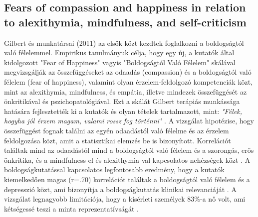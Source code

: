 \subsection*{Fears of compassion and happiness in relation	to alexithymia, mindfulness, and self-criticism \parencite{gilbert_mcewan_gibbons_chotai_duarte_matos_2011}}
Gilbert és munkatársai (2011) az elsők közt kezdtek foglalkozni a boldogságtól való félelemmel. Empirikus tanulmányuk célja, hogy egy új, a kutatók által kidolgozott "Fear of Happiness" vagyis "Boldogságtól Való Félelem" skálával \parencite{gilbert_mcewan_gibbons_chotai_duarte_matos_2011} megvizsgálják az összefüggéseket az odaadás (compassion) és a boldogságtól való félelem (fear of happiness), valamint olyan érzelem-feldolgozó kompetenciák közt, mint az  alexithymia, mindfulness, és empátia, illetve mindezek összefüggését az önkritikával és pszichopatológiával. Ezt a skálát Gilbert terápiás munkássága hatására fejlesztették ki a kutatók és olyan tételek tartalmazott, mint: \textit{"Félek, hogyha jól érzem magam, valami rossz fog történni"} \parencite[o. 381]{gilbert_mcewan_gibbons_chotai_duarte_matos_2011}. A vizsgálat hipotézise, hogy összefüggést fognak találni az egyén odaadástól való félelme és az érzelem feldolgozása közt, amit a statisztikai elemzés be is bizonyított. Korrelációt találtak mind az odaadástól mind a boldogságtól való félelem és a szorongás, erős önkritika, és a mindfulness-el és alexithymia-val kapcsolatos nehézségek közt \parencite{gilbert_mcewan_gibbons_chotai_duarte_matos_2011}. A boldogságkutatással kapcsolatos legfontosabb eredmény, hogy a kutatók kiemelkedően magas (r=.70) korrelációt találtak a boldogságtól való félelem és a depresszió közt, ami bizonyítja a boldogságkutatás klinikai relevanciáját \parencite{gilbert_mcewan_gibbons_chotai_duarte_matos_2011}. A vizsgálat legnagyobb limitációja, hogy a kísérleti személyek 83\%-a nő volt, ami kétségessé teszi a minta reprezentatívságát \parencite{gilbert_mcewan_gibbons_chotai_duarte_matos_2011}.

